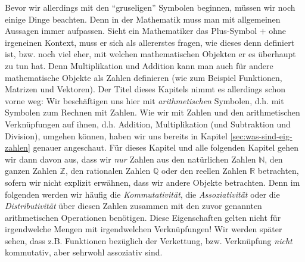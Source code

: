 Bevor wir allerdings mit den "`gruseligen"' Symbolen beginnen, müssen wir noch einige Dinge beachten. Denn in der Mathematik muss man mit allgemeinen Aussagen immer aufpassen. Sieht ein Mathematiker das Plus-Symbol \(+\) ohne irgeneinen Kontext, muss er sich als allererstes fragen, wie dieses denn definiert ist, bzw. noch viel eher, mit welchen mathematischen Objekten er es überhaupt zu tun hat. Denn Multiplikation und Addition kann man auch für andere mathematische Objekte als Zahlen definieren (wie zum Beispiel Funktionen, Matrizen und Vektoren). Der Titel dieses Kapitels nimmt es allerdings schon vorne weg: Wir beschäftigen uns hier mit \textit{arithmetischen} Symbolen, d.h. mit Symbolen zum Rechnen mit Zahlen. Wie wir mit Zahlen und den arithmetischen Verknüpfungen auf ihnen, d.h. Addition, Multiplikation (und Subtraktion und Division), umgehen können, haben wir uns bereits in Kapitel \ref{sec:was-sind-eig-zahlen} genauer angeschaut. Für dieses Kapitel und alle folgenden Kapitel gehen wir dann davon aus, dass wir \textit{nur} Zahlen aus den natürlichen Zahlen \(\mathbb N\), den ganzen Zahlen \(\mathbb Z\), den rationalen Zahlen \(\mathbb Q\) oder den reellen Zahlen \(\mathbb R\) betrachten, sofern wir nicht explizit erwähnen, dass wir andere Objekte betrachten. Denn im folgenden werden wir häufig die \textit{Kommutativität}, die \textit{Assoziativität} oder die \textit{Distributivität} über diesen Zahlen zusammen mit den zuvor genannten arithmetischen Operationen benötigen. Diese Eigenschaften gelten nicht für irgendwelche Mengen mit irgendwelchen Verknüpfungen! Wir werden später sehen, dass z.B. Funktionen bezüglich der Verkettung, bzw. Verknüpfung \textit{nicht} kommutativ, aber sehrwohl assoziativ sind. 

